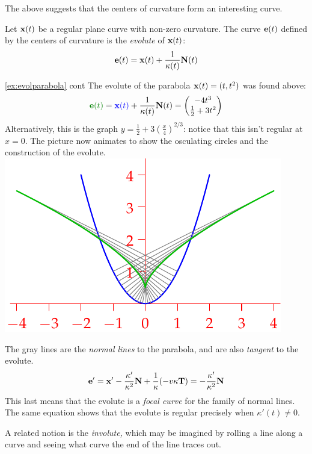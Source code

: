 The above suggests that the centers of curvature form an interesting curve.

\begin{defn}{}{}
Let ${\mathbf{x}}(t)$ be a regular plane curve with non-zero curvature. The curve ${\mathbf{e}}(t)$ defined by the centers of curvature is the \emph{evolute} of ${\mathbf{x}}(t)$:
\[{\mathbf{e}}(t)={\mathbf{x}}(t)+\frac 1{\kappa(t)}{\mathbf{N}}(t)\]
\end{defn}

\begin{example*}[lower separated=false, sidebyside, sidebyside align=top seam, sidebyside gap=0pt, righthand width=0.49\linewidth]{\ref{ex:evolparabola} cont}{}
The evolute of the parabola ${\mathbf{x}}(t)=(t,t^2)$ was found above:
\[\textcolor{Green}{\ve(t)}=\textcolor{blue}{\vx(t)}+\frac 1{\kappa(t)}\vN(t)=\twovec{-4t^3}{\frac 12+3t^2}\]
Alternatively, this is the graph $y=\frac 12+3\left(\frac x4\right)^{2/3}$: notice that this isn't regular at $x=0$.\smallbreak
The picture now animates to show the osculating circles and the construction of the evolute.
\tcblower
\flushright
\href{http://math.uci.edu/~ndonalds/math162a/radii-evolute.html}{\includegraphics[scale=1]{radii-evolute2}}
\end{example*}

The gray lines are the \emph{normal lines} to the parabola, and are also \emph{tangent} to the evolute.
\[{\mathbf{e}}'={\mathbf{x}}'-\frac{\kappa'}{\kappa^2}{\mathbf{N}}+\frac 1\kappa(-v\kappa{\mathbf{T}})=-\frac{\kappa'}{\kappa^2}{\mathbf{N}}\]
This last means that the evolute is a \emph{focal curve} for the family of normal lines. The same equation shows that the evolute is regular precisely when $\kappa'(t)\neq 0$. 

\vfil

\goodbreak


A related notion is the \emph{involute,} which may be imagined by rolling a line along a curve and seeing what curve the end of the line traces out.

